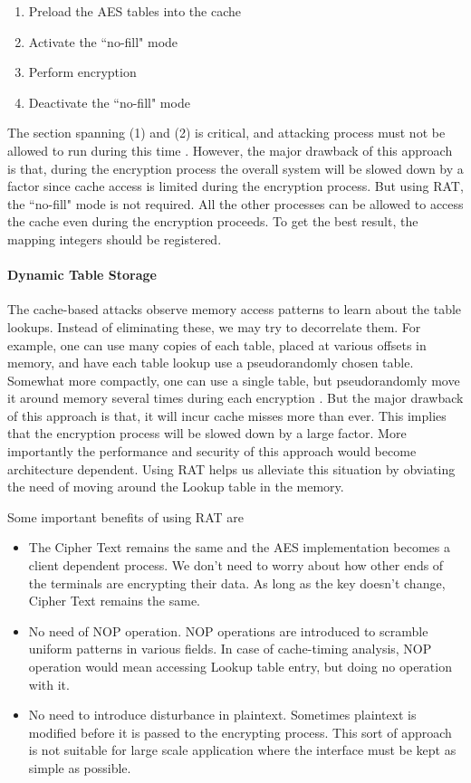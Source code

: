 \begin{enumerate}
\item Preload the AES tables into the cache
\item Activate the ``no-fill" mode
\item Perform encryption
\item Deactivate the ``no-fill" mode
\end{enumerate}

The section spanning (1) and (2) is critical, and attacking process must not be allowed to run during this time \citep{osvik}. However, the major drawback of this approach is that, during the encryption process the overall system will be slowed down by a factor since cache access is limited during the encryption process. But using RAT, the ``no-fill" mode is not required. All the other processes can be allowed to access the cache even during the encryption proceeds. To get the best result, the mapping integers should be registered.\\

\paragraph{Dynamic Table Storage}
The cache-based attacks observe memory access patterns to learn about the table lookups. Instead of eliminating these, we may try to decorrelate them. For example, one can use many copies of each table, placed at various offsets in memory, and have each table lookup use a pseudorandomly chosen table. Somewhat more compactly, one can use a single table, but pseudorandomly move it around memory several times during each encryption \citep{osvik}. But the major drawback of this approach is that, it will incur cache misses more than ever. This implies that the encryption process will be slowed down by a large factor. More importantly the performance and security of this approach would become architecture dependent. Using RAT helps us alleviate this situation by obviating the need of moving around the Lookup table in the memory.

Some important benefits of using RAT are
\begin{itemize}
\item The Cipher Text remains the same and the AES implementation becomes a client dependent process. We don't need to worry about how other ends of the terminals are encrypting their data. As long as the key doesn't change, Cipher Text remains the same.
\item No need of NOP operation. NOP operations are introduced to scramble uniform patterns in various fields. In case of cache-timing analysis, NOP operation would mean accessing Lookup table entry, but doing no operation with it.
\item No need to introduce disturbance in plaintext. Sometimes plaintext is modified before it is passed to the encrypting process. This sort of approach is not suitable for large scale application where the interface must be kept as simple as possible.

\end{itemize}
